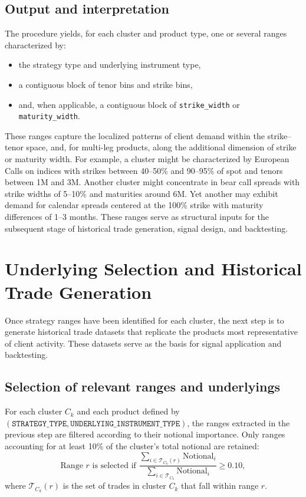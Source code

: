 \documentclass[12pt,a4paper]{report}
\begin{document}
\subsection{Output and interpretation}

The procedure yields, for each cluster and product type, one or several ranges characterized by:
\begin{itemize}
    \item the strategy type and underlying instrument type,  
    \item a contiguous block of tenor bins and strike bins,  
    \item and, when applicable, a contiguous block of \texttt{strike\_width} or \texttt{maturity\_width}.  
\end{itemize}

These ranges capture the localized patterns of client demand within the strike--tenor space, 
and, for multi-leg products, along the additional dimension of strike or maturity width. 
For example, a cluster might be characterized by European Calls on indices with strikes 
between 40--50\% and 90--95\% of spot and tenors between 1M and 3M. Another cluster might 
concentrate in bear call spreads with strike widths of 5--10\% and maturities around 6M. 
Yet another may exhibit demand for calendar spreads centered at the 100\% strike with 
maturity differences of 1--3 months. These ranges serve as structural inputs for the subsequent 
stage of historical trade generation, signal design, and backtesting.




\section{Underlying Selection and Historical Trade Generation}

Once strategy ranges have been identified for each cluster, the next step is to generate historical trade datasets that replicate the products most representative of client activity. These datasets serve as the basis for signal application and backtesting.

\subsection{Selection of relevant ranges and underlyings}

For each cluster \(C_k\) and each product defined by \((\texttt{STRATEGY\_TYPE}, \texttt{UNDERLYING\_INSTRUMENT\_TYPE})\), the ranges extracted in the previous step are filtered according to their notional importance. Only ranges accounting for at least 10\% of the cluster’s total notional are retained:
\[
    \text{Range } r \text{ is selected if } 
    \frac{\sum_{i \in \mathcal{T}_{C_k}(r)} \text{Notional}_i}{\sum_{i \in \mathcal{T}_{C_k}} \text{Notional}_i} \geq 0.10,
\]
where \(\mathcal{T}_{C_k}(r)\) is the set of trades in cluster \(C_k\) that fall within range \(r\).
\end{document}
